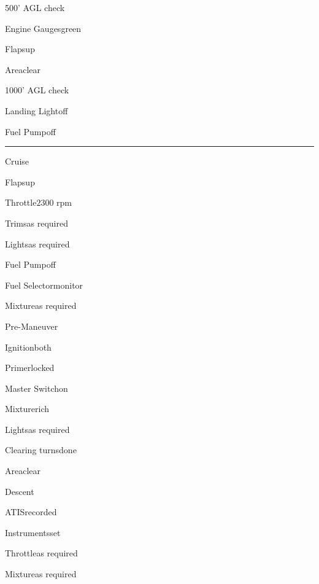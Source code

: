 \begin{multicols}{2}
\begin{checklist}{500' AGL check}
    \item{Engine Gauges}{green}
    \item{Flaps}{up}
    \item{Area}{clear}
\end{checklist}

\begin{checklist}{1000' AGL check}
    \item{Landing Light}{off}
    \item{Fuel Pump}{off}
\end{checklist}

\noindent\rule{0.9\linewidth}{0.4pt}
\vspace{0.5em}

\begin{checklist}{Cruise}
    \item{Flaps}{up}
    \item{Throttle}{$2300$ rpm}
    \item{Trims}{as required}
    \item{Lights}{as required}
    \item{Fuel Pump}{off}
    \item{Fuel Selector}{monitor}
    \item{Mixture}{as required}
\end{checklist}

\begin{checklist}{Pre-Maneuver}
    \item{Ignition}{both}
    \item{Primer}{locked}
    \item{Master Switch}{on}
    \item{Mixture}{rich}
    \item{Lights}{as required}
    \item{Clearing turns}{done}
    \item{Area}{clear}
\end{checklist}

\vfill\null
\columnbreak

\begin{checklist}{Descent}
    \item{ATIS}{recorded}
    \item{Instruments}{set}
    \item{Throttle}{as required}
    \item{Mixture}{as required}
\end{checklist}


\end{multicols}
